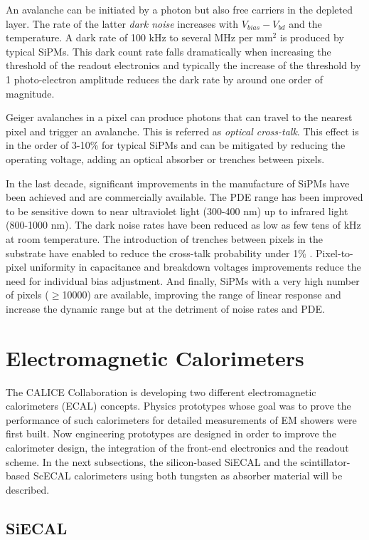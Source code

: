 An avalanche can be initiated by a photon but also free carriers in the depleted layer. The rate of the latter \textit{dark noise} increases with $V_{bias} - V_{bd}$ and the temperature. A dark rate of 100 kHz to several MHz per mm$^2$ is produced by typical SiPMs. This dark count rate falls dramatically when increasing the threshold of the readout electronics and typically the increase of the threshold by 1 photo-electron amplitude reduces the dark rate by around one order of magnitude.

Geiger avalanches in a pixel can produce photons that can travel to the nearest pixel and trigger an avalanche. This is referred as \textit{optical cross-talk}. This effect is in the order of 3-10\% for typical SiPMs and can be mitigated by reducing the operating voltage, adding an optical absorber or trenches between pixels.

In the last decade, significant improvements in the manufacture of SiPMs have been achieved and are commercially available. The PDE range has been improved to be sensitive down to near ultraviolet light (300-400 nm) up to infrared light (800-1000 nm). The dark noise rates have been reduced as low as few tens of kHz at room temperature. The introduction of trenches between pixels in the substrate have enabled to reduce the cross-talk probability under 1\% \cite{Liu:2015cpe}. Pixel-to-pixel uniformity in capacitance and breakdown voltages improvements reduce the need for individual bias adjustment. And finally, SiPMs with a very high number of pixels ($\geq$10000) are available, improving the range of linear response and increase the dynamic range but at the detriment of noise rates and PDE.

\section{Electromagnetic Calorimeters}

The CALICE Collaboration is developing two different electromagnetic calorimeters (ECAL) concepts. Physics prototypes whose goal was to prove the performance of such calorimeters for detailed measurements of EM showers were first built. Now engineering prototypes are designed in order to improve the calorimeter design, the integration of the front-end electronics and the readout scheme. In the next subsections, the silicon-based SiECAL and the scintillator-based ScECAL calorimeters using both tungsten as absorber material will be described.

\subsection{SiECAL}

